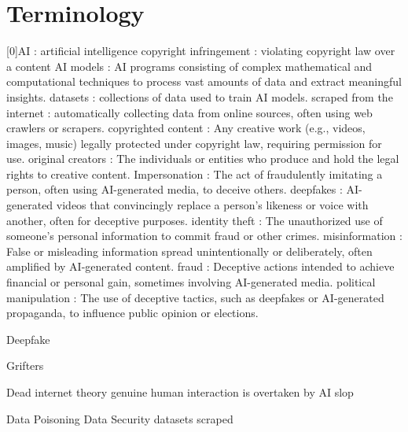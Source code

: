 \section{Terminology}
\label{section:terminology}

[0]AI : artificial intelligence \newline
[1]copyright infringement : violating copyright law over a content \newline 
[2]AI models : AI programs consisting of complex mathematical and computational techniques to process vast amounts of data and extract meaningful insights. \newline
[3]datasets : collections of data used to train AI models. \newline
[4]scraped from the internet : automatically collecting data from online sources, often using web crawlers or scrapers. \newline
[5]copyrighted content : Any creative work (e.g., videos, images, music) legally protected under copyright law, requiring permission for use. \newline
[6]original creators : The individuals or entities who produce and hold the legal rights to creative content. \newline
[7]Impersonation : The act of fraudulently imitating a person, often using AI-generated media, to deceive others. \newline
[8]deepfakes : AI-generated videos that convincingly replace a person’s likeness or voice with another, often for deceptive purposes. \newline
[9]identity theft : The unauthorized use of someone’s personal information to commit fraud or other crimes. \newline
[10]misinformation : False or misleading information spread unintentionally or deliberately, often amplified by AI-generated content. \newline
[11]fraud : Deceptive actions intended to achieve financial or personal gain, sometimes involving AI-generated media. \newline
[12]political manipulation : The use of deceptive tactics, such as deepfakes or AI-generated propaganda, to influence public opinion or elections. \newline

Deepfake

Grifters

Dead internet theory
    genuine human interaction is overtaken by AI slop

Data Poisoning
Data Security
datasets
scraped

